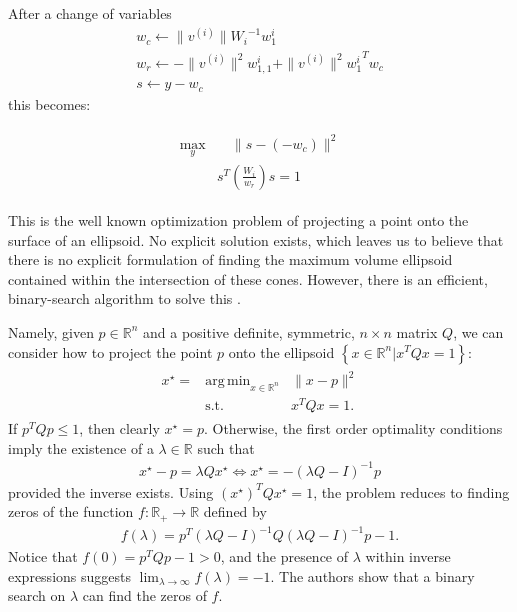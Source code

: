 \documentclass{article}
\theoremstyle{case}
\numberwithin{theorem}{subsection}
\DeclareMathOperator*{\argmin}{arg\,min}
\newcommand{\reals}{\mathbb R}
\newcommand{\Rn}{\mathbb R^n}
\begin{document}
After a change of variables
\begin{align*}
w_c \gets \|v^{(i)}\|{W_i}^{-1}w_1^i \\
w_r \gets  - \|v^{(i)}\|^2{w_{1,1}^i} + \|v^{(i)}\|^2{{w_1^i}}^Tw_c \\
s \gets y - w_c
\end{align*}
this becomes:

\begin{align}
\label{cone_feasibility_check}
\begin{array}{ccc}
\max_{y} & \quad \|s - \left(-w_c\right)\|^2  \\
 & s^T\left(\frac {W_i}{w_r}\right)s = 1
 \end{array}
\end{align}

This is the well known optimization problem of projecting a point onto the surface of an ellipsoid.
No explicit solution exists, which leaves us to believe that there is no explicit formulation of finding the maximum volume ellipsoid contained within the intersection of these cones.
However, there is an efficient, binary-search algorithm to solve this \cite{projecttoellipsoid}.


Namely, given 
$p \in \Rn$ and a positive definite, symmetric, $n \times n$ matrix $Q$,
we can consider how to project the point $p$ onto the ellipsoid $\left\{x \in \Rn \bigg | x^TQx = 1 \right\}$:
\begin{align*}
\begin{array}{ccc}
x^{\star} = &\argmin_{x \in \Rn} & \|x - p\|^2 \\
& \textrm{s.t.} & x^TQx = 1.
\end{array}
\end{align*}
If $p^TQp \le 1$, then clearly $x^{\star} = p$.
Otherwise, the first order optimality conditions imply the existence of a $\lambda \in \reals$ such that
\begin{align*}
x^{\star} - p = \lambda Qx^{\star} %
\Longleftrightarrow x^{\star} = -\left(\lambda Q - I\right)^{-1}p
\end{align*}
provided the inverse exists.
Using $\left(x^{\star}\right)^TQx^{\star} = 1$, the problem reduces to finding zeros of the function $f : \reals_+ \to \reals$ defined by
\begin{align*}
f(\lambda) = p^T\left(\lambda Q - I\right)^{-1}Q\left(\lambda Q - I\right)^{-1}p - 1.
\end{align*}
Notice that $f(0) = p^TQp - 1 > 0$, and the presence of $\lambda$ within inverse expressions suggests $\lim_{\lambda \to \infty}f(\lambda) = -1$.
The authors show that a binary search on $\lambda$ can find the zeros of $f$.
\end{document}
